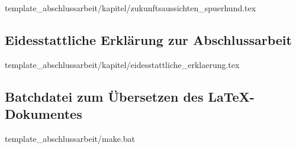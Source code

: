 
	{template_abschlussarbeit/kapitel/zukunftsaussichten_spuerhund.tex}

\newpage
\subsection{Eidesstattliche Erklärung zur Abschlussarbeit}
\label{subsec:eidesstatt}

	{template_abschlussarbeit/kapitel/eidesstattliche_erklaerung.tex}

\newpage
\subsection{Batchdatei zum Übersetzen des LaTeX-Dokumentes}
\label{subsec:batchdatei}

	{template_abschlussarbeit/make.bat}	
	
%
%

